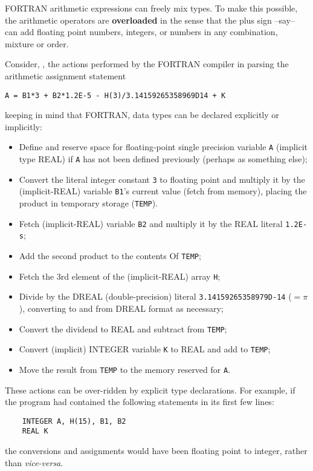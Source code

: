 FORTRAN arithmetic expressions can freely mix types. To make this possible, the arithmetic operators are \textbf{overloaded} in the sense that the plus sign --say-- can add floating point numbers, integers, or numbers in any combination, mixture or order.

Consider, \eg, the actions performed by the FORTRAN compiler in parsing the arithmetic assignment statement 

\begin{verbatim}
A = B1*3 + B2*1.2E-5 - H(3)/3.14159265358969D14 + K
\end{verbatim}

keeping in mind that FORTRAN, data types can be declared explicitly or implicitly:
\begin{itemize}
    \item Define and reserve space for floating-point single precision variable \verb|A| (implicit type REAL) if \verb|A| has not been defined previously (perhaps as something else);
    \item Convert the literal integer constant \verb|3| to floating point and multiply it by the (implicit-REAL) variable \verb|B1|'s current value (fetch from memory), placing the product in temporary storage (\verb|TEMP|).
    \item Fetch (implicit-REAL) variable \verb|B2| and multiply it by the REAL literal \verb|1.2E-s|;
    \item Add the second product to the contents Of \verb|TEMP|;
    \item Fetch the 3rd element of the (implicit-REAL) array \verb|H|;
    \item Divide by the DREAL (double-precision) literal \verb|3.14159265358979D-14| ($= \pi$ ), converting to and from DREAL format as necessary;
    \item Convert the dividend to REAL and subtract from \verb|TEMP|;
    \item Convert (implicit) INTEGER variable \verb|K| to REAL and add to \verb|TEMP|;
    \item Move the result from \verb|TEMP| to the memory reserved for \verb|A|.
\end{itemize}

These actions can be over-ridden by explicit type declarations. For example, if the program had contained the following statements in its first few lines:
\begin{verbatim}
    INTEGER A, H(15), B1, B2 
    REAL K
\end{verbatim}
the conversions and assignments would have been floating point to integer, rather than \textit{vice-versa}.

